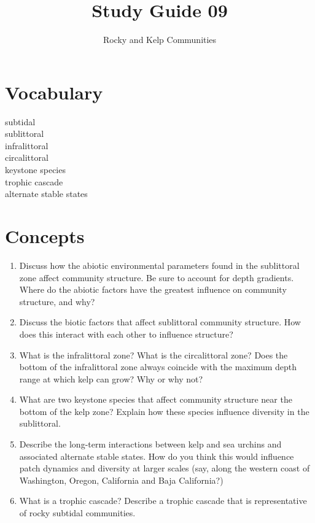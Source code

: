 \documentclass[nofonts, letterpaper]{tufte-handout}
\title{Study Guide 09}
\author{Rocky and Kelp Communities}
\date{} %
\begin{document}
\maketitle	%


\section{Vocabulary}
\vspace{-1\baselineskip}
\begin{multicols}{2}
subtidal \\
sublittoral \\
infralittoral \\
circalittoral \\
keystone species \\
trophic cascade \\
alternate stable states
\end{multicols}

\section{Concepts}

\begin{enumerate}
\item
  Discuss how the abiotic environmental parameters found in the
  sublittoral zone affect community structure. Be sure to account for
  depth gradients. Where do the abiotic factors have the greatest
  influence on community structure, and why?
\item
  Discuss the biotic factors that affect sublittoral community
  structure. How does this interact with each other to influence
  structure?
\item
  What is the infralittoral zone? What is the circalittoral zone? Does
  the bottom of the infralittoral zone always coincide with the maximum
  depth range at which kelp can grow? Why or why not?
\item
  What are two keystone species that affect community structure near the
  bottom of the kelp zone? Explain how these species influence diversity
  in the sublittoral.
\item
  Describe the long-term interactions between kelp and sea urchins and associated alternate stable states.
  How do you think this would influence patch dynamics and diversity at
  larger scales (say, along the western coast of Washington, Oregon,
  California and Baja California?)
\item
  What is a trophic cascade? Describe a trophic cascade that is
  representative of rocky subtidal communities.
 \end{enumerate}
\end{document}
